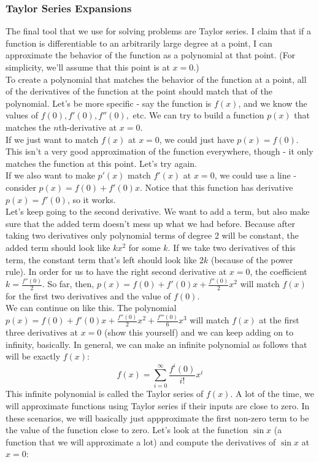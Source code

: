 \subsubsection{Taylor Series Expansions}
The final tool that we use for solving problems are Taylor series. I claim that if a function is differentiable to an arbitrarily large degree at a point, I can approximate the behavior of the function as a polynomial at that point. (For simplicity, we'll assume that this point is at $x=0$.)\\
To create a polynomial that matches the behavior of the function at a point, all of the derivatives of the function at the point should match that of the polynomial. Let's be more specific - say the function is $f(x)$, and we know the values of $f(0), f'(0), f''(0),$ etc. We can try to build a function $p(x)$ that matches the $n$th-derivative at $x=0$. \\
If we just want to match $f(x)$ at $x=0$, we could just have $p(x) = f(0)$. This isn't a very good approximation of the function everywhere, though - it only matches the function at this point. Let's try again. \\
If we also want to make $p'(x)$ match $f'(x)$ at $x =0$, we could use a line - consider $p(x) = f(0) + f'(0) x$. Notice that this function has derivative $p(x) = f'(0)$, so it works. \\
Let's keep going to the second derivative. We want to add a term, but also make sure that the added term doesn't mess up what we had before. Because after taking two derivatives only polynomial terms of degree 2 will be constant, the added term should look like $kx^2$ for some $k$. If we take two derivatives of this term, the constant term that's left should look like $2k$ (because of the power rule). In order for us to have the right second derivative at $x = 0$, the coefficient $k = \frac{f''(0)}{2}$. So far, then, $p(x) = f(0) + f'(0)x + \frac{f''(0)}{2}x^2$ will match $f(x)$ for the first two derivatives and the value of $f(0)$. \\
We can continue on like this. The polynomial $p(x) = f(0) + f'(0)x + \frac{f''(0)}{2} x^2 + \frac{f'''(0)}{6} x^3$ will match $f(x)$ at the first three derivatives at $x=0$ (show this yourself) and we can keep adding on to infinity, basically. In general, we can make an infinite polynomial as follows that will be exactly $f(x)$:
\[
	f(x) = \sum_{i=0}^{\infty} \frac{f^{i}(0)}{i!}x^i
\]
This infinite polynomial is called the Taylor series of $f(x)$. A lot of the time, we will approximate functions using Taylor series if their inputs are close to zero. In these scenarios, we will basically just appproximate the first non-zero term to be the value of the function close to zero. Let's look at the function $\sin x$ (a function that we will approximate a lot) and compute the derivatives of $\sin x$ at $x=0$:
